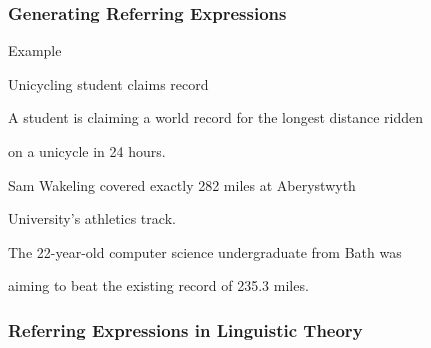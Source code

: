 \documentclass[compress,color=usenames]{beamer}
\begin{document}
\begin{frame}
\frametitle{Generating Referring Expressions}






Example



Unicycling student claims record



A student is claiming a world record for the longest distance ridden



on a unicycle in 24 hours.



Sam Wakeling covered exactly 282 miles at Aberystwyth



University's athletics track.



The 22-year-old computer science undergraduate from Bath was



aiming to beat the existing record of 235.3 miles.
\end{frame}

\begin{frame}
\frametitle{Referring Expressions in Linguistic Theory}





\end{frame}
\end{document}
